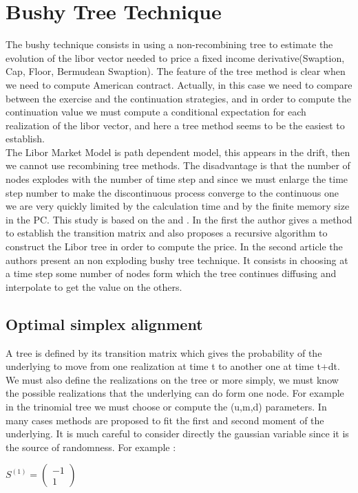 \newcommand{\winlin}{/}
\section{Bushy Tree Technique}
The bushy technique consists in using a non-recombining tree to estimate the evolution of the libor vector needed to price a fixed income derivative(Swaption, Cap, Floor, Bermudean Swaption). The feature of the tree method is clear when we need to compute American contract. Actually, in this case we need to compare between the exercise and the continuation strategies, and in order to compute the continuation value we must compute a conditional expectation for each realization of the libor vector, and here a tree method seems to be the easiest to establish.\\
The Libor Market Model is path dependent model, this appears in the drift, then we cannot use recombining tree methods. The disadvantage is that the number of nodes explodes with the number of time step and since we must enlarge the time step number to make the discontinuous process converge to the continuous one we are very quickly limited by the calculation time and by the finite memory size in the PC. This study is based on the \cite{Jackel} and \cite{TANGLANGE}. In the first the author gives a method to establish the transition matrix and also proposes a recursive algorithm to construct the Libor tree in order to compute the price. In the second article the authors present an non exploding bushy tree technique. It consists in choosing at a time step some number of nodes form which the tree continues diffusing and interpolate to get the value on the others.

\subsection{Optimal simplex alignment}
A tree is defined by its transition matrix which gives the probability of the underlying to move from one realization at time t to another one at time t+dt. We must also define the realizations on the tree or more simply, we must know the possible realizations that the underlying can do form one node. For example in the trinomial tree we must choose or compute the (u,m,d) parameters. In many cases methods are proposed to fit the first and second moment of the underlying. It is much careful to consider directly the gaussian variable since it is the source of randomness. For example  :

\begin{math}
S^{(1)} = \left(
\begin{array}{c}
			-1 \\
      1 
\end{array}
\right)
\end{math}

